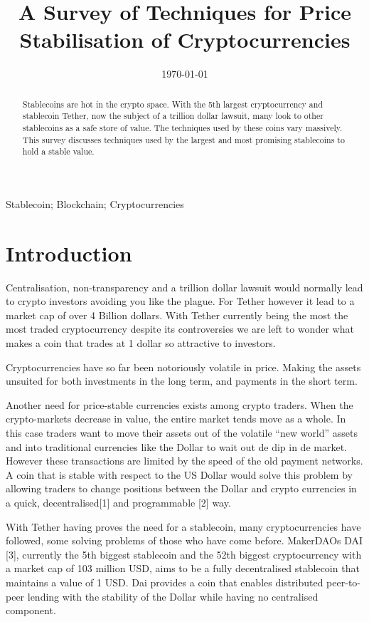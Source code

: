 \documentclass[english,]{IEEEtran}
\title{A Survey of Techniques for Price Stabilisation of Cryptocurrencies}
\author{
            \IEEEauthorblockN{Robert Wessel Blokzijl}
        \IEEEauthorblockA{%
            TU Delft \\
            Delft, The Netherlands \\
            R.W.Blokzijl@student.tudelft.nl}
        }
\date{\today}
\begin{document}
\maketitle
\begin{abstract}
Stablecoins are hot in the crypto space. With the 5th largest
cryptocurrency and stablecoin Tether, now the subject of a trillion
dollar lawsuit, many look to other stablecoins as a safe store of value.
The techniques used by these coins vary massively. This survey discusses
techniques used by the largest and most promising stablecoins to hold a
stable value.
\end{abstract}

\begin{IEEEkeywords}
    Stablecoin;
    Blockchain;
    Cryptocurrencies\end{IEEEkeywords}

\hypertarget{introduction}{%
\section{Introduction}\label{introduction}}

Centralisation, non-transparency and a trillion dollar lawsuit would
normally lead to crypto investors avoiding you like the plague. For
Tether however it lead to a market cap of over 4 Billion dollars. With
Tether currently being the most the most traded cryptocurrency despite
its controversies we are left to wonder what makes a coin that trades at
1 dollar so attractive to investors.

Cryptocurrencies have so far been notoriously volatile in price. Making
the assets unsuited for both investments in the long term, and payments
in the short term.

Another need for price-stable currencies exists among crypto traders.
When the crypto-markets decrease in value, the entire market tends move
as a whole. In this case traders want to move their assets out of the
volatile ``new world'' assets and into traditional currencies like the
Dollar to wait out de dip in de market. However these transactions are
limited by the speed of the old payment networks. A coin that is stable
with respect to the US Dollar would solve this problem by allowing
traders to change positions between the Dollar and crypto currencies in
a quick, decentralised{[}1{]} and programmable {[}2{]} way.

With Tether having proves the need for a stablecoin, many
cryptocurrencies have followed, some solving problems of those who have
come before. MakerDAOs DAI {[}3{]}, currently the 5th biggest stablecoin
and the 52th biggest cryptocurrency with a market cap of 103 million
USD, aims to be a fully decentralised stablecoin that maintains a value
of 1 USD. Dai provides a coin that enables distributed peer-to-peer
lending with the stability of the Dollar while having no centralised
component.
\end{document}

